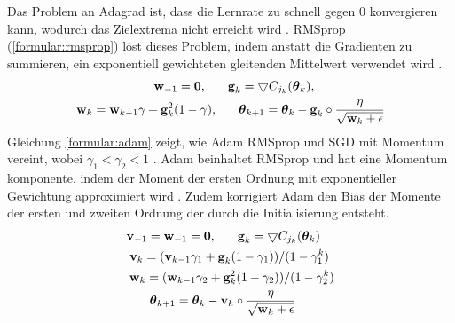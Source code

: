 Das Problem an Adagrad ist, dass die Lernrate zu schnell gegen 0 konvergieren kann, wodurch das Zielextrema nicht erreicht wird \cite{bengio2017deep}.
RMSprop \cite{hinton2012neural} (\ref{formular:rmsprop}) löst dieses Problem, indem anstatt die Gradienten zu summieren, ein
exponentiell gewichteten gleitenden Mittelwert verwendet wird \cite{bengio2017deep}.
\begin{align}
    \label{formular:rmsprop}
    \textbf{w}_{-1} = \textbf{0}, \hspace{0.6cm}
    \textbf{g}_k = \bigtriangledown C_{j_k}(\boldsymbol\theta_k), \hspace{2cm} \nonumber\\
    \textbf{w}_k = \textbf{w}_{k-1}\gamma + \textbf{g}_k^2 (1-\gamma), \hspace{0.6cm}
    \boldsymbol\theta_{k+1} = \boldsymbol\theta_k - \textbf{g}_k \circ \frac{\eta}{\sqrt{\textbf{w}_k + \epsilon}}
\end{align}
Gleichung \ref{formular:adam} zeigt, wie Adam RMSprop und SGD mit Momentum vereint, wobei $\gamma_1 < \gamma_2 < 1$ \cite{kingma2014adam}.
Adam beinhaltet RMSprop und hat eine Momentum komponente, indem der Moment der ersten Ordnung mit exponentieller Gewichtung approximiert wird \cite{bengio2017deep}.
Zudem korrigiert Adam den Bias der Momente der ersten und zweiten Ordnung der durch die Initialisierung entsteht.
\begin{align}
    \label{formular:adam}
    \textbf{v}_{-1} = \textbf{w}_{-1} = \textbf{0}, \hspace{0.6cm}
    \textbf{g}_k = \bigtriangledown C_{j_k}(\boldsymbol\theta_k) \hspace{0.4cm} \nonumber\\
    \textbf{v}_k = (\textbf{v}_{k-1}\gamma_1 + \textbf{g}_k (1-\gamma_1))/(1 - \gamma_1^k) \hspace{0.15cm} \nonumber\\
    \textbf{w}_k = (\textbf{w}_{k-1}\gamma_2 + \textbf{g}_k^2 (1-\gamma_2))/(1 - \gamma_2^k) \nonumber\\
    \boldsymbol\theta_{k+1} = \boldsymbol\theta_k - \textbf{v}_k \circ \frac{\eta}{\sqrt{\textbf{w}_k + \epsilon}} \hspace{1.1cm}
\end{align}